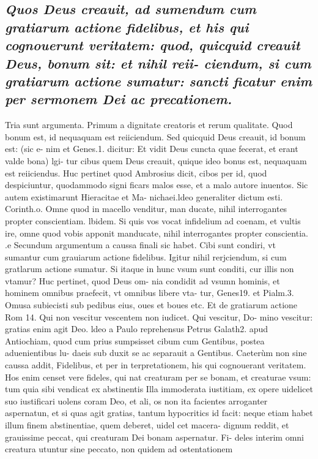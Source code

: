 \documentclass{article}
\begin{document}
\begin{pages}
\subsection*{\textit{Quos Deus creauit, ad sumendum cum gratiarum actione fidelibus, et his qui cognouerunt veritatem: quod, quicquid creauit Deus, bonum sit: et nihil reii- ciendum, si cum gratiarum actione sumatur: sancti ficatur enim per sermonem Dei ac precationem. }}\pstart Tria sunt argumenta. Primum a dignitate creatoris et rerum qualitate. Quod bonum est, id nequaquam est reiiciendum. Sed quicquid Deus creauit, id bonum est: (sic e- nim et Genes.1. dicitur: Et vidit Deus cuncta quae fecerat, et erant valde bona) lgi- tur cibus quem Deus creauit, quique ideo bonus est, nequaquam est reiiciendus. Huc pertinet quod Ambrosius dicit, cibos per id, quod despiciuntur, quodammodo signi ficars malos esse, et a malo autore inuentos. Sic autem existimarunt Hieracitae et Ma- nichaei.ldeo generaliter dictum esti. Corinth.o. Omne quod in macello venditur, man  ducate, nihil interrogantes propter conscientiam. lbidem. Si quis vos vocat infidelium ad coenam,  et vultis ire, omne quod vobis apponit manducate, nihil interrogantes propter conscientia. .e  \pend\pstart Secundum argumentum a caussa finali sic habet. Cibi sunt condiri, vt sumantur cum grauiarum actione fidelibus. Igitur nihil rerjciendum, si cum gratlarum actione sumatur. Si itaque in hunc vsum sunt conditi, cur illis non vtamur? Huc pertinet, quod Deus om- nia condidit ad vsumn hominis, et hominem omnibus praefecit, vt omnibus libere vta- tur, Genes19. et Pialm.3. Omusa subiecisti sub pedibus eius, oues et boues etc. Et de gratiarum actione Rom 14. Qui non vescitur vescentem non iudicet. Qui vescitur, Do- mino vescitur: gratias enim agit Deo. ldeo a Paulo reprehensus Petrus Galath2. apud Antiochiam, quod cum prius sumpsisset cibum cum Gentibus, postea aduenientibus lu- daeis sub duxit se ac separauit a Gentibus. Caeterùm non sine caussa addit, Fidelibus, et per in terpretationem, his qui cognouerant veritatem. Hos enim censet vere fideles, qui nat creaturam per se bonam, et creaturae vsum: tum quia sibi vendicat ex abstinentis Illa immoderata iustitiam, ex opere uidelicet suo iustificari uolens coram Deo, et ali, os non ita facientes arroganter aspernatun, et si quas agit gratias, tantum hypocritics id facit: neque etiam habet illum finem abstinentiae, quem deberet, uidel cet macera- dignum reddit, et grauissime peccat, qui creaturam Dei bonam aspernatur. Fi- deles interim omni creatura utuntur sine peccato, non quidem ad ostentationem  \pend

\end{pages}
\end{document}
